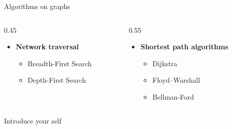 \documentclass[aspectratio=169]{beamer}
\renewcommand{\alert}[1]{\textbf{\color{swufe}#1}}
\begin{document}
    \begin{frame}{Algorithms on graphs}
        \begin{columns}[t] %
            \begin{column}{0.45\textwidth}
                \begin{itemize}
                    \item \alert{Network traversal}
                    \begin{itemize}
                        \item Breadth-First Search
                        \item Depth-First Search
                    \end{itemize}
                \end{itemize}
            \end{column}
            
            \begin{column}{0.55\textwidth}
                \begin{itemize}
                    \item \alert{Shortest path algorithms}
                    \begin{itemize}
                        \item Dijkstra
                        \item Floyd–Warshall
                        \item Bellman-Ford
                    \end{itemize}
                \end{itemize}
            \end{column}
        \end{columns}

        \begin{note}
            {Introduce your self}
        \end{note}
    \end{frame}
\end{document}
